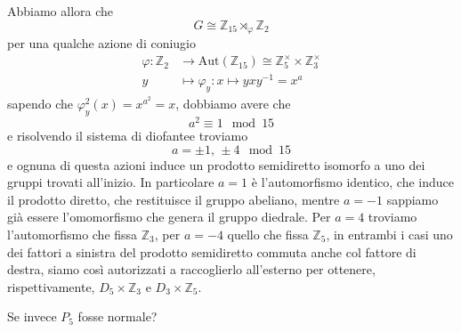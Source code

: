 \documentclass[a4paper]{article}
\theoremstyle{remark}
\theoremstyle{definition}
\newcommand{\Aut}[1]{\mathrm{Aut}\left( #1 \right)}
\newcommand{\Z}{\mathbb{Z}}
\newcommand{\fun}[5]{\begin{align*}
	#1 \colon #2 &\to #3 \\
	#4 &\mapsto #5
	\end{align*}}
\begin{document}
\begin{multicols}{2}
Abbiamo allora che
\[ G \cong \mathbb{Z}_{15} \rtimes_\varphi \mathbb{Z}_2 \]
per una qualche azione di coniugio 
\fun{\varphi}{\mathbb{Z}_2}{\Aut{\mathbb{Z}_{15}}\cong \mathbb{Z}_5^\times\times\mathbb{Z}_3^\times}{y}{\varphi_y: x \mapsto yxy^{-1} = x^a}
sapendo che $ \varphi_y^2(x) = x^{a^2} = x $, dobbiamo avere che $$  a^2 \equiv 1 \mod{15}  $$ e risolvendo il sistema di diofantee troviamo
\[ a = \pm 1,\, \pm 4 \mod{15} \]
e ognuna di questa azioni induce un prodotto semidiretto isomorfo a uno dei gruppi trovati all'inizio. In particolare $ a = 1 $ è l'automorfismo identico, che induce il prodotto diretto, che restituisce il gruppo abeliano, mentre $ a = -1 $ sappiamo già essere l'omomorfismo che genera il gruppo diedrale. Per $ a = 4 $ troviamo l'automorfismo che fissa $ \mathbb{Z}_3 $, per $ a = -4 $ quello che fissa $ \mathbb{Z}_5 $, in entrambi i casi uno dei fattori a sinistra del prodotto semidiretto commuta anche col fattore di destra, siamo così autorizzati a raccoglierlo all'esterno per ottenere, rispettivamente, $ D_5\times\mathbb{Z}_3 $ e $ D_{3}\times\Z_5 $.
	
Se invece $ P_5 $ fosse normale?
	
\end{multicols}
\end{document}
